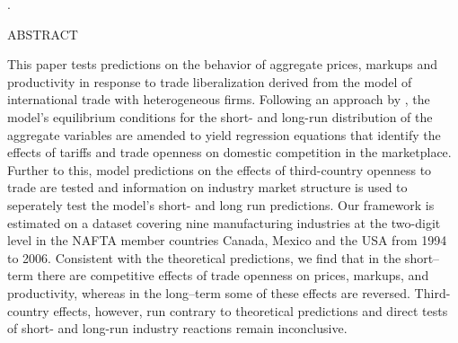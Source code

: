 \documentclass[a4paper,12pt]{article}
\begin{document}
. \vspace{.1cm}
\begin{center}
\large{ABSTRACT} 
\end{center}
This paper tests predictions on the behavior of aggregate prices, markups and productivity in response to trade liberalization derived from the \citet{MelitzOttaviano2008} model of international trade with heterogeneous firms. Following an approach by \citet*{Chen2009}, the model's equilibrium conditions for the short- and long-run distribution of the aggregate variables are amended to yield regression equations that identify the effects of tariffs and trade openness on domestic competition in the marketplace. Further to this, model predictions on the effects of third-country openness to trade are tested and information on industry market structure is used to seperately test the model's short- and long run predictions. Our framework is estimated on a dataset covering nine manufacturing industries at the two-digit level in the NAFTA member countries Canada, Mexico and the USA from 1994 to 2006. Consistent with the theoretical predictions, we find that in the short--term there are competitive effects of trade openness on prices, markups, and productivity, whereas in the long--term some of these effects are reversed. Third-country effects, however, run contrary to theoretical predictions and direct tests of short- and long-run industry reactions remain inconclusive.

\pagebreak

\doublespace
\end{document}

